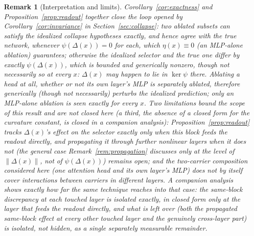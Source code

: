 \documentclass[11pt,a4paper]{article}
\newtheorem{remark}{Remark}
\begin{document}
\begin{remark}[Interpretation and limits]
Corollary~\ref{cor:exactness} and Proposition~\ref{prop:readout} together
close the loop opened by Corollary~\ref{cor:invariance} in
Section~\ref{sec:collapse}: two ablated subsets can satisfy the idealized
collapse hypotheses exactly, and hence agree with the true network, whenever
$\psi(\Delta(x))=0$ for each, which $\eta(x)\equiv0$ (an MLP-alone ablation)
guarantees; otherwise the idealized selector and the true one differ by
exactly $\psi(\Delta(x))$, which is bounded and generically nonzero, though
not necessarily so at every $x$: $\Delta(x)$ may happen to lie in $\ker\psi$
there. Ablating a head at all, whether or not its own layer's MLP
is separately ablated, therefore generically (though not necessarily)
perturbs the idealized prediction; only an MLP-alone ablation is seen exactly
for every $x$. Two limitations bound the scope of this result and are not
closed here (a third, the absence of a closed form for the curvature
constant, is closed in a companion analysis): Proposition~\ref{prop:readout}
tracks $\Delta(x)$'s effect on the selector exactly only when this block
feeds the readout directly, and propagating it through further nonlinear
layers when it does not (the general case Remark~\ref{rem:propagation}
discusses only at the level of $\|\Delta(x)\|$, not of $\psi(\Delta(x))$)
remains open; and the two-carrier composition considered here (one attention
head and its own layer's MLP) does not by itself cover interactions between
carriers in different layers. A companion analysis shows exactly how far the
same technique reaches into that case: the same-block discrepancy at each
touched layer is isolated exactly, in closed form only at the layer that
feeds the readout directly, and what is left over (both the propagated
same-block effect at every other touched layer and the genuinely cross-layer
part) is isolated, not hidden, as a single separately measurable
remainder.
\end{remark}
\end{document}
